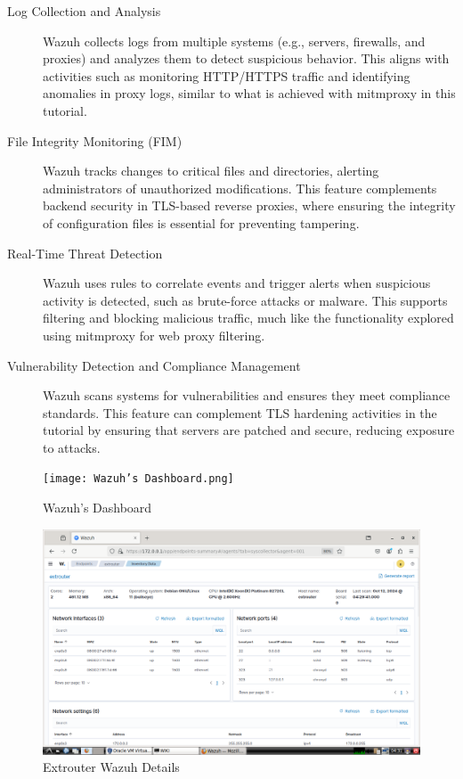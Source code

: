 \documentclass[12pt,a4paper]{report}
\begin{document}
\begin{description}
	\item[Log Collection and Analysis] Wazuh collects logs from multiple systems (e.g., servers, firewalls, and proxies) and analyzes them to detect suspicious behavior. This aligns with activities such as monitoring HTTP/HTTPS traffic and identifying anomalies in proxy logs, similar to what is achieved with mitmproxy in this tutorial.
	
	\item[File Integrity Monitoring (FIM)] Wazuh tracks changes to critical files and directories, alerting administrators of unauthorized modifications. This feature complements backend security in TLS-based reverse proxies, where ensuring the integrity of configuration files is essential for preventing tampering.
	
	\item[Real-Time Threat Detection] Wazuh uses rules to correlate events and trigger alerts when suspicious activity is detected, such as brute-force attacks or malware. This supports filtering and blocking malicious traffic, much like the functionality explored using mitmproxy for web proxy filtering.
	
	\item[Vulnerability Detection and Compliance Management] Wazuh scans systems for vulnerabilities and ensures they meet compliance standards. This feature can complement TLS hardening activities in the tutorial by ensuring that servers are patched and secure, reducing exposure to attacks.
\end{description}

\begin{figure}[H]
\centering
\texttt{[image: Wazuh’s Dashboard.png]}
\caption{Wazuh’s Dashboard}
\end{figure}

\begin{figure}[H]
\centering
\includegraphics[width=\textwidth]{extrouter details.png}
\caption{Extrouter Wazuh Details}
\end{figure}
\end{document}

